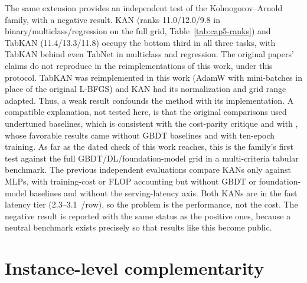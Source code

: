 The same extension provides an independent test of the
Kolmogorov--Arnold family, with a negative result. KAN (ranks 11.0/12.0/9.8 in binary/multiclass/regression on the full grid, Table~\ref{tab:cap5-ranks}) and TabKAN
(11.4/13.3/11.8) occupy the bottom third in all three tasks, with
TabKAN behind even TabNet in multiclass and regression. The
original papers' claims \citep{kan2024,tabkan2025} do not reproduce in
the reimplementations of this work, under this protocol. TabKAN was
reimplemented in this work (AdamW with mini-batches in place of the original
L-BFGS) and KAN had its normalization and grid range adapted. Thus,
a weak result confounds the method with its implementation. A
compatible explanation, not tested here, is that the original
comparisons used undertuned baselines, which is consistent
with the cost-parity critique \citep{kancritical2024} and with
\citet{poeta2024}, whose favorable results came without GBDT baselines
and with ten-epoch training. As far as the dated check of this work reaches, this
is the family's first test against the full GBDT/DL/foundation-model
grid in a multi-criteria tabular benchmark. The previous independent
evaluations \citep{poeta2024,kancritical2024} compare KANs only
against MLPs, with training-cost or FLOP accounting but
without GBDT or foundation-model baselines and without the serving-latency
axis. Both KANs are in the fast latency tier (2.3--3.1~\us/row), so
the problem is the performance, not the cost. The negative
result is reported with the same status as the positive ones, because a neutral
benchmark exists precisely so that results like this become public.

\section{Instance-level complementarity}
\label{sec:cap5-ato5}

